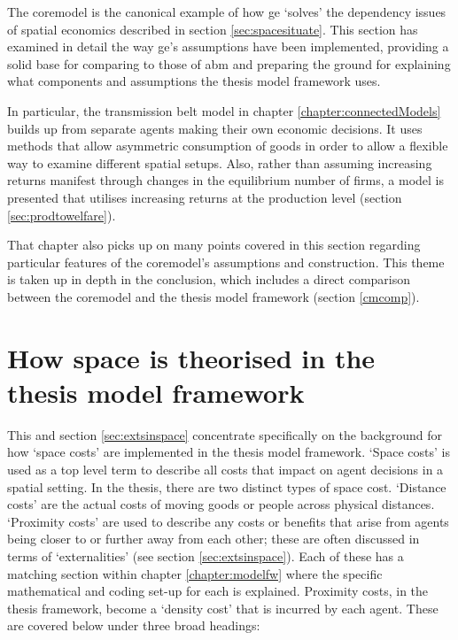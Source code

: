 {The \gls{coremodel} is the canonical example of how \gls{ge} `solves' the dependency issues of spatial economics described in section \ref{sec:spacesituate}. This section has examined in detail the way \gls{ge}'s assumptions have been implemented, providing a solid base for comparing to those of \gls{abm} and preparing the ground for explaining what components and assumptions the thesis model framework uses. 

In particular, the transmission belt model in chapter \ref{chapter:connectedModels} builds up from separate agents making their own economic decisions. It uses methods that allow asymmetric consumption of goods in order to allow a flexible way to examine different spatial setups. Also, rather than assuming increasing returns manifest through changes in the equilibrium number of firms, a model is presented that utilises increasing returns at the production level (section \ref{sec:prodtowelfare}). 

That chapter also picks up on many points covered in this section regarding particular features of the \gls{coremodel}'s assumptions and construction. This theme is taken up in depth in the conclusion, which includes a direct comparison between the \gls{coremodel} and the thesis model framework (section \ref{cmcomp}). 

\section{How space is theorised in the thesis model framework \label{sec:elementsmodel}}

This and section \ref{sec:extsinspace} concentrate specifically on the background for how `space costs' are implemented in the thesis model framework. `Space costs' is used as a top level term to describe all costs that impact on agent decisions in a spatial setting. In the thesis, there are two distinct types of space cost.  `Distance costs' are the actual costs of moving goods or people across physical distances. `Proximity costs' are used to describe any costs or benefits that arise from agents being closer to or further away from each other; these are often discussed in terms of `externalities' (see section \ref{sec:extsinspace}). Each of these has a matching section within chapter \ref{chapter:modelfw} where the specific mathematical and coding set-up for each is explained. Proximity costs, in the thesis framework, become a `density cost' that is incurred by each agent. These are covered below under three broad headings:

}
